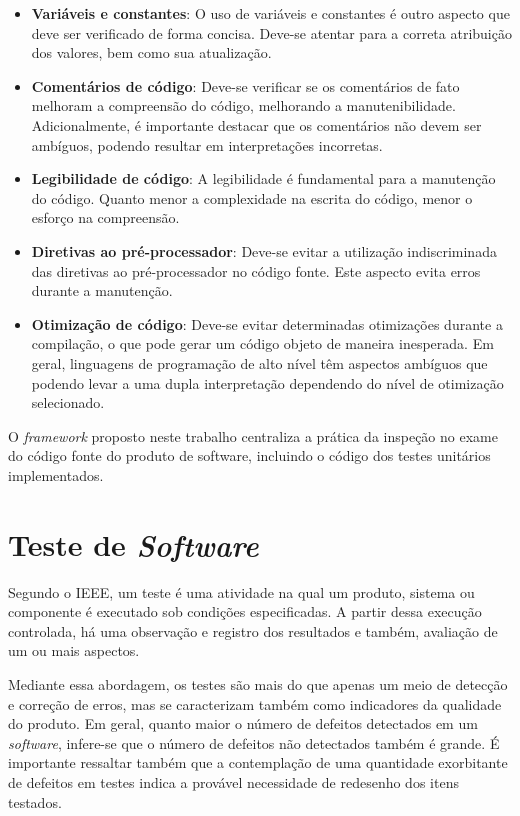 \begin{itemize}
	\item \textbf{Variáveis e constantes}: O uso de variáveis e constantes é outro aspecto que deve ser verificado de forma concisa. Deve-se atentar para a correta atribuição dos valores, bem como sua atualização.

	\item \textbf{Comentários de código}: Deve-se verificar se os comentários de fato melhoram a compreensão do código, melhorando a manutenibilidade. Adicionalmente, é importante destacar que os comentários não devem ser ambíguos, podendo resultar em interpretações incorretas.

	\item \textbf{Legibilidade de código}: A legibilidade é fundamental para a manutenção do código. Quanto menor a complexidade na escrita do código, menor o esforço na compreensão.

	\item \textbf{Diretivas ao pré-processador}: Deve-se evitar a utilização indiscriminada das diretivas ao pré-processador no código fonte. Este aspecto evita erros durante a manutenção.

	\item \textbf{Otimização de código}: Deve-se evitar determinadas otimizações durante a compilação, o que pode gerar um código objeto de maneira inesperada. Em geral, linguagens de programação de alto nível têm aspectos ambíguos que podendo levar a uma dupla interpretação dependendo do nível de otimização selecionado.
\end{itemize}

O \textit{framework} proposto neste trabalho centraliza a prática da inspeção no exame do código fonte do produto de software, incluindo o código dos testes unitários implementados.

\section{Teste de \textit{Software}}

Segundo o IEEE, um teste é uma atividade na qual um produto, sistema ou componente é executado sob condições especificadas. A partir dessa execução controlada, há uma observação e registro dos resultados e também, avaliação de um ou mais aspectos.

Mediante essa abordagem, os testes são mais do que apenas um meio de detecção e correção de erros, mas se caracterizam também como indicadores da qualidade do produto. Em geral, quanto maior o número de defeitos detectados em um \textit{software}, infere-se que o número de defeitos não detectados também é grande. É importante ressaltar também que a contemplação de uma quantidade exorbitante de defeitos em testes indica a provável necessidade de redesenho dos itens testados.

